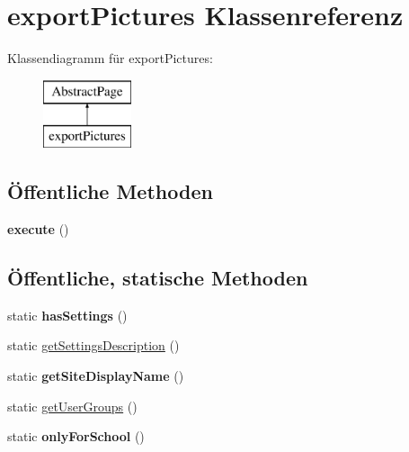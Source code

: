 \hypertarget{classexport_pictures}{}\section{export\+Pictures Klassenreferenz}
\label{classexport_pictures}
Klassendiagramm für export\+Pictures\+:\begin{figure}[H]
\begin{center}
\leavevmode
\includegraphics[height=2.000000cm]{classexport_pictures}
\end{center}
\end{figure}
\subsection*{Öffentliche Methoden}
\begin{DoxyCompactItemize}
\item 
\mbox{\label{classexport_pictures_a2ec6de100740ba2b09ea65ab0bea40dd}} 
{\bfseries execute} ()
\end{DoxyCompactItemize}
\subsection*{Öffentliche, statische Methoden}
\begin{DoxyCompactItemize}
\item 
\mbox{\label{classexport_pictures_a7f53307d449d131099bcc7a0fbd8e9b8}} 
static {\bfseries has\+Settings} ()
\item 
static \mbox{\hyperlink{classexport_pictures_ac849698213f23ed2f6ae5e175eec21b8}{get\+Settings\+Description}} ()
\item 
\mbox{\label{classexport_pictures_a1ae7fc22c77309322a1136d058bb6d93}} 
static {\bfseries get\+Site\+Display\+Name} ()
\item 
static \mbox{\hyperlink{classexport_pictures_a39ef5f34f14334d6b7e51bfb8ec4c13f}{get\+User\+Groups}} ()
\item 
\mbox{\label{classexport_pictures_a76d4613f9ee8405e73ca52a0dd17bd59}} 
static {\bfseries only\+For\+School} ()
\end{DoxyCompactItemize}
